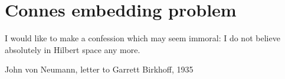 \section{Connes embedding problem}
\epigraph{I would like to make a confession which may seem immoral: I do not believe absolutely in Hilbert space any more.}{John von Neumann, letter to Garrett Birkhoff, 1935}

